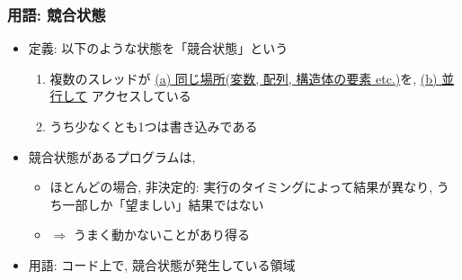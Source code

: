 \documentclass[12pt,dvipdfmx]{beamer}
\begin{document}
\iffalse
\begin{frame}
  \frametitle{用語: 生産者消費者同期 (producer-consumer synchronization)}
  \begin{itemize}
  \item 値を計算($=$生産)するスレッドから使用($=$消費)するスレッドへ,
    正しくデータを受け渡す
  \end{itemize}

  
  これらを見ると, メモリを共有しているから簡単に
  通信(データ共有)が出来るというわけではなさそうとわかる

\end{frame}
\fi


\begin{frame}
  \frametitle{用語: 競合状態}
  \begin{itemize}
  \item [] 定義: 以下のような状態を「競合状態」という
    \begin{enumerate}
    \item 複数のスレッドが
      \underline{(a) 同じ場所(変数, 配列, 構造体の要素 etc.)}を, 
      \underline{(b) 並行して}
      アクセスしている
    \item うち少なくとも1つは書き込みである
    \end{enumerate}
  \item 競合状態があるプログラムは, 
    \begin{itemize}
    \item ほとんどの場合, 非決定的: 実行のタイミングによって結果が異なり,
      うち一部しか「望ましい」結果ではない
    \item $\Rightarrow$ うまく動かないことがあり得る
    \end{itemize}
  \item 用語: 
    コード上で, 競合状態が発生している領域
  \end{itemize}
\end{frame}
\end{document}
